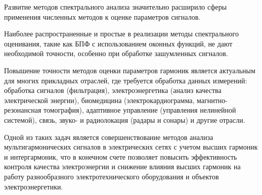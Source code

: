 {\actuality} 

Развитие методов спектрального анализа значительно расширило сферы применения численных методов к оценке параметров сигналов.

Наиболее распространенные и простые в реализации методы спектрального оценивания, такие как БПФ с использованием оконных функций, не дают необходимой точности, особенно при обработке зашумленных сигналов.

Повышение точности методов оценки параметров гармоник является актуальным для многих прикладных отраслей, где требуется обработка данных измерений: обработка сигналов (фильтрация), электроэнергетика (анализ качества электрической энергии), биомедицина (электрокардиограмма, магнитно-резонансная томография), адаптивное управление (управления нелинейной системой), связь, звуко- и радиолокация (радары и сонары) и другие отрасли.

Одной из таких задач является совершенствование методов анализа мультигармонических сигналов в электрических сетях с учетом высших гармоник и интергармоник, что в конечном счете позволяет повысить эффективность контроля качества электроэнергии и снижение влияния высших гармоник на работу разнообразного электротехнического оборудования и объектов электроэнергетики. 

